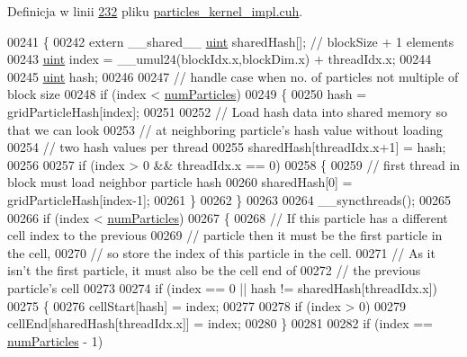 Definicja w linii \hyperlink{particles__kernel__impl_8cuh_source_l00232}{232} pliku \hyperlink{particles__kernel__impl_8cuh_source}{particles\-\_\-kernel\-\_\-impl.\-cuh}.


\begin{DoxyCode}
00241 \{
00242     \textcolor{keyword}{extern} \_\_shared\_\_ \hyperlink{particles__kernel_8cuh_a91ad9478d81a7aaf2593e8d9c3d06a14}{uint} sharedHash[];    \textcolor{comment}{// blockSize + 1 elements}
00243     \hyperlink{particles__kernel_8cuh_a91ad9478d81a7aaf2593e8d9c3d06a14}{uint} index = \_\_umul24(blockIdx.x,blockDim.x) + threadIdx.x;
00244 
00245     \hyperlink{particles__kernel_8cuh_a91ad9478d81a7aaf2593e8d9c3d06a14}{uint} hash;
00246 
00247     \textcolor{comment}{// handle case when no. of particles not multiple of block size}
00248     \textcolor{keywordflow}{if} (index < \hyperlink{particles_8cpp_a05b8a90212054a3eb1a036ae0c269596}{numParticles})
00249     \{
00250         hash = gridParticleHash[index];
00251 
00252         \textcolor{comment}{// Load hash data into shared memory so that we can look}
00253         \textcolor{comment}{// at neighboring particle's hash value without loading}
00254         \textcolor{comment}{// two hash values per thread}
00255         sharedHash[threadIdx.x+1] = hash;
00256 
00257         \textcolor{keywordflow}{if} (index > 0 && threadIdx.x == 0)
00258         \{
00259             \textcolor{comment}{// first thread in block must load neighbor particle hash}
00260             sharedHash[0] = gridParticleHash[index-1];
00261         \}
00262     \}
00263 
00264     \_\_syncthreads();
00265 
00266     \textcolor{keywordflow}{if} (index < \hyperlink{particles_8cpp_a05b8a90212054a3eb1a036ae0c269596}{numParticles})
00267     \{
00268         \textcolor{comment}{// If this particle has a different cell index to the previous}
00269         \textcolor{comment}{// particle then it must be the first particle in the cell,}
00270         \textcolor{comment}{// so store the index of this particle in the cell.}
00271         \textcolor{comment}{// As it isn't the first particle, it must also be the cell end of}
00272         \textcolor{comment}{// the previous particle's cell}
00273 
00274         \textcolor{keywordflow}{if} (index == 0 || hash != sharedHash[threadIdx.x])
00275         \{
00276             cellStart[hash] = index;
00277 
00278             \textcolor{keywordflow}{if} (index > 0)
00279                 cellEnd[sharedHash[threadIdx.x]] = index;
00280         \}
00281 
00282         \textcolor{keywordflow}{if} (index == \hyperlink{particles_8cpp_a05b8a90212054a3eb1a036ae0c269596}{numParticles} - 1)

\end{DoxyCode}
